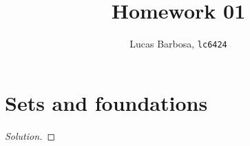 \documentclass[nohyper,nobib,nofonts]{tufte-handout}
\title{Homework 01}
\author{Lucas Barbosa, \texttt{lc6424}}
\date{}
\begin{document}
\maketitle

\section{Sets and foundations}
\label{sec:hw01:sets-and-foundations}

\begin{exercise}
  \label{ex:hw01:placeholder}
  \lipsum[1]
\end{exercise}

\begin{proof}[Solution]
  \lipsum[2]
\end{proof}
\end{document}
